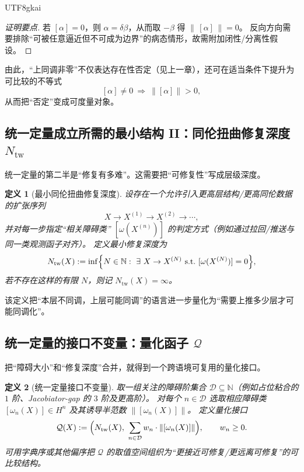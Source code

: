\documentclass[12pt]{article}
\newtheorem{definition}{定义}[section]
\begin{document}
\begin{CJK*}{UTF8}{gkai}
\begin{proof}[证明要点]
若 $[\alpha]=0$，则 $\alpha=\delta\beta$，从而取 $-\beta$ 得 $\|\,[\alpha]\,\|=0$。
反向方向需要排除“可被任意逼近但不可成为边界”的病态情形，故需附加闭性/分离性假设。
\end{proof}

由此，“上同调非零”不仅表达存在性否定（见上一章），还可在适当条件下提升为可比较的不等式
\[
  [\alpha]\neq 0\ \Longrightarrow\ \bigl\|[\alpha]\bigr\|>0,
\]
从而把“否定”变成可度量对象。

\subsection{统一定量成立所需的最小结构 II：同伦扭曲修复深度 $N_{\mathrm{tw}}$}

统一定量的第二半是“修复有多难”。这需要把“可修复性”写成层级深度。

\begin{definition}[最小同伦扭曲修复深度]\label{def:Ntw}
设存在一个允许引入更高层结构/更高同伦数据的扩张序列
\[
  X \longrightarrow X^{(1)} \longrightarrow X^{(2)} \longrightarrow \cdots,
\]
并对每一步指定“相关障碍类” $[\omega(X^{(n)})]$ 的判定方式（例如通过拉回/推送与同一类观测函子对齐）。
定义最小修复深度为
\[
  N_{\mathrm{tw}}(X)
  :=
  \inf\Bigl\{
    N\in\mathbb{N}:\ \exists\ X\to X^{(N)}\ \text{s.t.}\ [\omega(X^{(N)})]=0
  \Bigr\},
\]
若不存在这样的有限 $N$，则记 $N_{\mathrm{tw}}(X)=\infty$。
\end{definition}

该定义把“本层不同调，上层可能同调”的语言进一步量化为“需要上推多少层才可能同调化”。

\subsection{统一定量的接口不变量：量化函子 $\mathcal{Q}$}

把“障碍大小”和“修复深度”合并，就得到一个跨语境可复用的量化接口。

\begin{definition}[统一定量接口不变量]\label{def:Q-interface}
取一组关注的障碍阶集合 $\mathcal{D}\subseteq\mathbb{N}$（例如占位粘合的 $1$ 阶、Jacobiator-gap 的 $3$ 阶及更高阶）。
对每个 $n\in\mathcal{D}$ 选取相应障碍类 $[\omega_n(X)]\in H^n$ 及其诱导半范数 $\|[\omega_n(X)]\|$。
定义量化接口
\[
  \mathcal{Q}(X)
  :=
  \Bigl(
    N_{\mathrm{tw}}(X),\
    \sum_{n\in\mathcal{D}} w_n\cdot \|[\omega_n(X)]\|
  \Bigr),
  \qquad w_n\ge 0.
\]
可用字典序或其他偏序把 $\mathcal{Q}$ 的取值空间组织为“更接近可修复/更远离可修复”的可比较结构。
\end{definition}


\end{CJK*}
\end{document}
